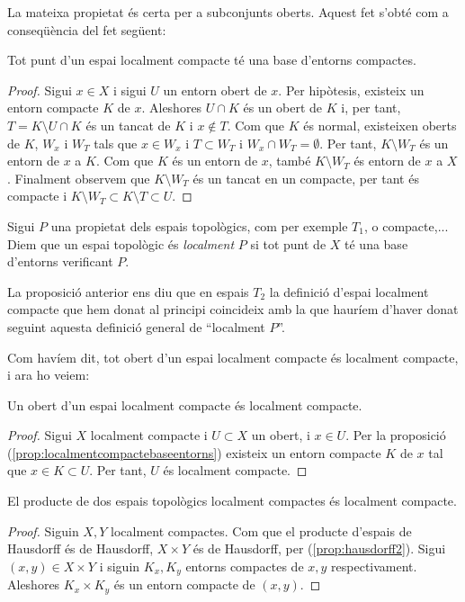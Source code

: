 \documentclass[../main.tex]{subfiles}
\begin{document}
La mateixa propietat és certa per a subconjunts oberts. Aquest fet s'obté com a conseqüència del fet següent:

\begin{prop}
\label{prop:localmentcompactebaseentorns} Tot punt d'un espai localment compacte té una base d'entorns compactes.
\end{prop}
\begin{proof}
Sigui $x\in X$ i sigui $U$ un entorn obert de $x$. Per hipòtesis, existeix un entorn compacte $K$ de $x$. Aleshores $U\cap K$ és un obert de $K$ i, per tant, $T = K\setminus U\cap K$ és un tancat de $K$ i $x\not\in T$. Com que $K$ és normal, existeixen oberts de $K$, $W_x$ i $W_T$ tals que $x\in W_x$ i $T\subset W_T$ i $W_x\cap W_T = \emptyset$. Per tant, $K\setminus W_T$ és un entorn de $x$ a $K$. Com que $K$ és un entorn de $x$, també $K\setminus W_T$ és entorn de $x$ a $X$. Finalment observem que $K\setminus W_T$ és un tancat en un compacte, per tant és compacte i $K\setminus W_T\subset K\setminus T\subset U$.
\end{proof}

\begin{defi}
[Localment]\label{def:localment} Sigui $P$ una propietat dels espais topològics, com per exemple $T_1$, o compacte,... Diem que un espai topològic és \textit{localment} $P$ si tot punt de $X$ té una base d'entorns verificant $P$.
\end{defi}

La proposició anterior ens diu que en espais $T_2$ la definició d'espai localment compacte que hem donat al principi coincideix amb la que hauríem d'haver donat seguint aquesta definició general de ``localment $P$''.

Com havíem dit, tot obert d'un espai localment compacte és localment compacte, i ara ho veiem:

\begin{coro}
\label{coro:localmentcompacteobert} Un obert d'un espai localment compacte és localment compacte.
\end{coro}
\begin{proof}
Sigui $X$ localment compacte i $U\subset X$ un obert, i $x\in U$. Per la proposició (\ref{prop:localmentcompactebaseentorns}) existeix un entorn compacte $K$ de $x$ tal que $x\in K\subset U$. Per tant, $U$ és localment compacte.
\end{proof}

\begin{prop}
\label{prop:productedelocalmentcompactes} El producte de dos espais topològics localment compactes és localment compacte.
\end{prop}
\begin{proof}
Siguin $X,Y$ localment compactes. Com que el producte d'espais de Hausdorff és de Hausdorff, $X\times Y$ és de Hausdorff, per (\ref{prop:hausdorff2}). Sigui $(x,y)\in X\times Y$ i siguin $K_x, K_y$ entorns compactes de $x,y$ respectivament. Aleshores $K_x\times K_y$ és un entorn compacte de $(x,y)$.
\end{proof}
\end{document}
